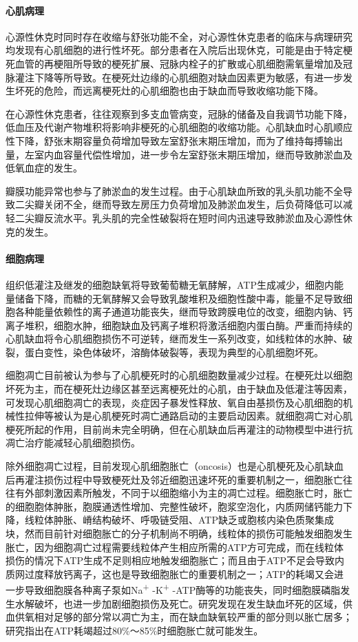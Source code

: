 \paragraph{心肌病理}

心源性休克时同时存在收缩与舒张功能不全，对心源性休克患者的临床与病理研究均发现有心肌细胞的进行性坏死。部分患者在入院后出现休克，可能是由于特定梗死血管的再梗阻所导致的梗死扩展、冠脉内栓子的扩散或心肌细胞需氧量增加及冠脉灌注下降等所导致。在梗死灶边缘的心肌细胞对缺血因素更为敏感，有进一步发生坏死的危险，而远离梗死灶的心肌细胞也由于缺血而导致收缩功能下降。

在心源性休克患者，往往观察到多支血管病变，冠脉的储备及自我调节功能下降，低血压及代谢产物堆积将影响非梗死的心肌细胞的收缩功能。心肌缺血时心肌顺应性下降，舒张末期容量负荷增加导致左室舒张末期压增加，而为了维持每搏输出量，左室内血容量代偿性增加，进一步令左室舒张末期压增加，继而导致肺淤血及低氧血症的发生。

瓣膜功能异常也参与了肺淤血的发生过程。由于心肌缺血所致的乳头肌功能不全导致二尖瓣关闭不全，继而导致左房压力负荷增加及肺淤血发生，后负荷降低可以减轻二尖瓣反流水平。乳头肌的完全性破裂将在短时间内迅速导致肺淤血及心源性休克的发生。

\paragraph{细胞病理}

组织低灌注及继发的细胞缺氧将导致葡萄糖无氧酵解，ATP生成减少，细胞内能量储备下降，而糖的无氧酵解又会导致乳酸堆积及细胞性酸中毒，能量不足导致细胞各种能量依赖性的离子通道功能丧失，继而导致跨膜电位的改变，细胞内钠、钙离子堆积，细胞水肿，细胞缺血及钙离子堆积将激活细胞内蛋白酶。严重而持续的心肌缺血将令心肌细胞损伤不可逆转，继而发生一系列改变，如线粒体的水肿、破裂，蛋白变性，染色体破坏，溶酶体破裂等，表现为典型的心肌细胞坏死。

细胞凋亡目前被认为参与了心肌梗死时的心肌细胞数量减少过程。在梗死灶以细胞坏死为主，而在梗死灶边缘区甚至远离梗死灶的心肌，由于缺血及低灌注等因素，可发现心肌细胞凋亡的表现，炎症因子暴发性释放、氧自由基损伤及心肌细胞的机械性拉伸等被认为是心肌梗死时凋亡通路启动的主要启动因素。就细胞凋亡对心肌梗死所起的作用，目前尚未完全明确，但在心肌缺血后再灌注的动物模型中进行抗凋亡治疗能减轻心肌细胞损伤。

除外细胞凋亡过程，目前发现心肌细胞胀亡（oncosis）也是心肌梗死及心肌缺血后再灌注损伤过程中导致梗死灶及邻近细胞迅速坏死的重要机制之一，细胞胀亡往往有外部刺激因素所触发，不同于以细胞缩小为主的凋亡过程。细胞胀亡时，胀亡的细胞胞体肿胀，胞膜通透性增加、完整性破坏，胞浆空泡化，内质网储钙能力下降，线粒体肿胀、嵴结构破坏、呼吸链受阻、ATP缺乏或胞核内染色质聚集成块，然而目前针对细胞胀亡的分子机制尚不明确，线粒体的损伤可能触发细胞发生胀亡，因为细胞凋亡过程需要线粒体产生相应所需的ATP方可完成，而在线粒体损伤的情况下ATP生成不足则相应地触发细胞胀亡；而且由于ATP不足会导致内质网过度释放钙离子，这也是导致细胞胀亡的重要机制之一；ATP的耗竭又会进一步导致细胞膜各种离子泵如Na\textsuperscript{+}
-K\textsuperscript{+}
-ATP酶等的功能丧失，同时细胞膜磷脂发生水解破坏，也进一步加剧细胞损伤及死亡。研究发现在发生缺血坏死的区域，供血供氧相对足够的部分常以凋亡为主，而在缺血缺氧较严重的部分则以胀亡居多；研究指出在ATP耗竭超过80\%～85\%时细胞胀亡就可能发生。

